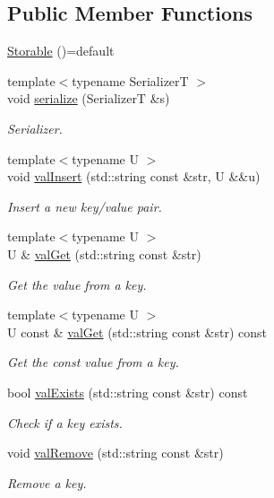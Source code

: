 \subsection*{Public Member Functions}
\begin{DoxyCompactItemize}
\item 
\hyperlink{structvt_1_1vrt_1_1collection_1_1storage_1_1_storable_aa6cb609d17c3fffd1416842cf9cc27e9}{Storable} ()=default
\item 
{\footnotesize template$<$typename SerializerT $>$ }\\void \hyperlink{structvt_1_1vrt_1_1collection_1_1storage_1_1_storable_a9fac390a50e3de2776afb730dd3c0418}{serialize} (SerializerT \&s)
\begin{DoxyCompactList}\small\item\em Serializer. \end{DoxyCompactList}\item 
{\footnotesize template$<$typename U $>$ }\\void \hyperlink{structvt_1_1vrt_1_1collection_1_1storage_1_1_storable_a8c0cbce1b3e261dd375d431a56a7c350}{val\+Insert} (std\+::string const \&str, U \&\&u)
\begin{DoxyCompactList}\small\item\em Insert a new key/value pair. \end{DoxyCompactList}\item 
{\footnotesize template$<$typename U $>$ }\\U \& \hyperlink{structvt_1_1vrt_1_1collection_1_1storage_1_1_storable_a81a60463dff73c6375422344c8eb410c}{val\+Get} (std\+::string const \&str)
\begin{DoxyCompactList}\small\item\em Get the value from a key. \end{DoxyCompactList}\item 
{\footnotesize template$<$typename U $>$ }\\U const  \& \hyperlink{structvt_1_1vrt_1_1collection_1_1storage_1_1_storable_a5014622ff587047270462efeca4ca2dd}{val\+Get} (std\+::string const \&str) const
\begin{DoxyCompactList}\small\item\em Get the const value from a key. \end{DoxyCompactList}\item 
bool \hyperlink{structvt_1_1vrt_1_1collection_1_1storage_1_1_storable_a46884264a54e5be7fc231208dc468b8e}{val\+Exists} (std\+::string const \&str) const
\begin{DoxyCompactList}\small\item\em Check if a key exists. \end{DoxyCompactList}\item 
void \hyperlink{structvt_1_1vrt_1_1collection_1_1storage_1_1_storable_a760fb8a543d0684b259fdbf078bcafb8}{val\+Remove} (std\+::string const \&str)
\begin{DoxyCompactList}\small\item\em Remove a key. \end{DoxyCompactList}\end{DoxyCompactItemize}
